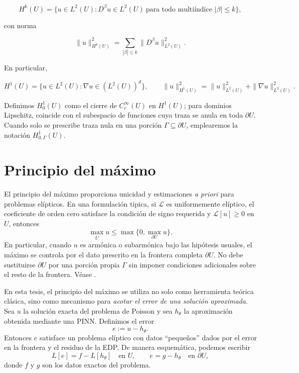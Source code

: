 \[
H^k(U)=\big\{u\in L^2(U): D^\beta u\in L^2(U)\ \text{para todo multiíndice }|\beta|\le k\big\},
\]

con norma

\[
\|u\|_{H^k(U)}^2=\sum_{|\beta|\le k}\|D^\beta u\|_{L^2(U)}^2.
\]

En particular,

\[
H^1(U)=\{u\in L^2(U): \nabla u\in (L^2(U))^d\},\qquad
\|u\|_{H^1(U)}^2=\|u\|_{L^2(U)}^2+\|\nabla u\|_{L^2(U)}^2.
\]

Definimos $H_0^1(U)$ como el cierre de $C_c^\infty(U)$ en $H^1(U)$; para dominios Lipschitz, coincide con el subespacio de funciones cuya traza se anula en toda $\partial U$. Cuando solo se prescribe traza nula en una porción $\Gamma\subseteq\partial U$, emplearemos la notación $H^1_{0,\Gamma}(U)$.

\section{Principio del máximo}

El principio del máximo proporciona unicidad y estimaciones \emph{a priori} para problemas elípticos. En una formulación típica, si $\mathcal{L}$ es uniformemente elíptico, el coeficiente de orden cero satisface la condición de signo requerida y $\mathcal{L}[u]\geq 0$ en $U$, entonces
\[
\max_{\overline U}u\leq \max\bigl\{0,\max_{\partial U}u\bigr\}.
\]
En particular, cuando $u$ es armónica o subarmónica bajo las hipótesis usuales, el máximo se controla por el dato prescrito en la frontera completa $\partial U$. No debe sustituirse $\partial U$ por una porción propia $\Gamma$ sin imponer condiciones adicionales sobre el resto de la frontera. Véase \cite{gilbarg2001elliptic}.

En esta tesis, el principio del máximo se utiliza no solo como herramienta teórica clásica, sino como mecanismo para \emph{acotar el error de una solución aproximada}. Sea $u$ la solución exacta del problema de Poisson y sea $h_\theta$ la aproximación obtenida mediante una PINN. Definimos el error
\[
e := u - h_\theta.
\]
Entonces $e$ satisface un problema elíptico con datos ``pequeños'' dados por el error en la frontera y el residuo de la EDP. De manera esquemática, podemos escribir
\[
L[e] = f - L[h_\theta] \quad \text{en } U, \qquad
e = g - h_\theta \quad \text{en } \partial U,
\]
donde $f$ y $g$ son los datos exactos del problema.

